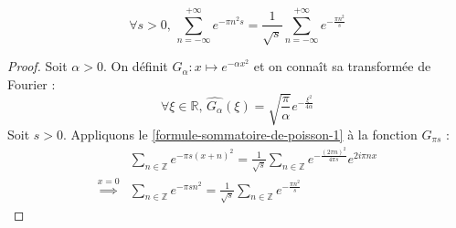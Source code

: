   \begin{application}
    \[ \forall s > 0, \, \sum_{n=-\infty}^{+\infty} e^{-\pi n^2 s} = \frac{1}{\sqrt{s}} \sum_{n=-\infty}^{+\infty} e^{-\frac{\pi n^2}{s}} \]
  \end{application}

  \begin{proof}
    Soit $\alpha > 0$. On définit $G_\alpha : x \mapsto e^{-\alpha x^2}$ et on connaît sa transformée de Fourier :
    \[ \forall \xi \in \mathbb{R}, \, \widehat{G_\alpha}(\xi) = \sqrt{\frac{\pi}{\alpha}} e^{-\frac{\xi^2}{4 \alpha}} \]
    Soit $s > 0$. Appliquons le \cref{formule-sommatoire-de-poisson-1} à la fonction $G_{\pi s}$ :
    \begin{align*}
      & \sum_{n \in \mathbb{Z}} e^{-\pi s (x + n)^2} = \frac{1}{\sqrt{s}} \sum_{n \in \mathbb{Z}} e^{-\frac{(2 \pi n)^2}{4 \pi s}} e^{2 i \pi n x} \\
      \overset{x = 0}{\implies} & \sum_{n \in \mathbb{Z}} e^{-\pi s n^2} = \frac{1}{\sqrt{s}} \sum_{n \in \mathbb{Z}} e^{-\frac{\pi n^2}{s}}
    \end{align*}
  \end{proof}

